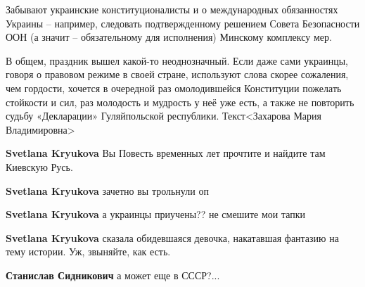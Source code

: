 \begin{itemize}
\begin{itemize}
Забывают украинские конституционалисты и о международных обязанностях Украины –
например, следовать подтвержденному решением Совета Безопасности ООН (а значит
– обязательному для исполнения) Минскому комплексу мер.

В общем, праздник вышел какой-то неоднозначный. Если даже сами украинцы, говоря
о правовом режиме в своей стране, используют слова скорее сожаления, чем
гордости, хочется в очередной раз омолодившейся Конституции пожелать стойкости
и сил, раз молодость и мудрость у неё уже есть, а также не повторить судьбу
«Декларации» Гуляйпольской республики. Текст<Захарова Мария Владимировна>

 
\textbf{Svetlana Kryukova} Вы Повесть временных лет прочтите и найдите там Киевскую Русь.

 
\textbf{Svetlana Kryukova} зачетно вы трольнули оп 🤑

 
\textbf{Svetlana Kryukova} а украинцы приучены?? не смешите мои тапки

 
\textbf{Svetlana Kryukova} сказала обидевшаяся девочка, накатавшая фантазию на тему истории. Уж, звыняйте, как есть.

 
\textbf{Станислав Сидникович} а может еще в СССР?...


\end{itemize}
\end{itemize}
